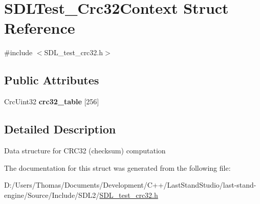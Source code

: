 \hypertarget{structSDLTest__Crc32Context}{}\section{S\+D\+L\+Test\+\_\+\+Crc32\+Context Struct Reference}
\label{structSDLTest__Crc32Context}


{\ttfamily \#include $<$S\+D\+L\+\_\+test\+\_\+crc32.\+h$>$}

\subsection*{Public Attributes}
\begin{DoxyCompactItemize}
\item 
\hypertarget{structSDLTest__Crc32Context_ae95d0d0b48bafc4e2f6f032f754ffa4c}{}Crc\+Uint32 {\bfseries crc32\+\_\+table} \mbox{[}256\mbox{]}\label{structSDLTest__Crc32Context_ae95d0d0b48bafc4e2f6f032f754ffa4c}

\end{DoxyCompactItemize}


\subsection{Detailed Description}
Data structure for C\+R\+C32 (checksum) computation 

The documentation for this struct was generated from the following file\+:\begin{DoxyCompactItemize}
\item 
D\+:/\+Users/\+Thomas/\+Documents/\+Development/\+C++/\+Last\+Stand\+Studio/last-\/stand-\/engine/\+Source/\+Include/\+S\+D\+L2/\hyperlink{SDL__test__crc32_8h}{S\+D\+L\+\_\+test\+\_\+crc32.\+h}\end{DoxyCompactItemize}

